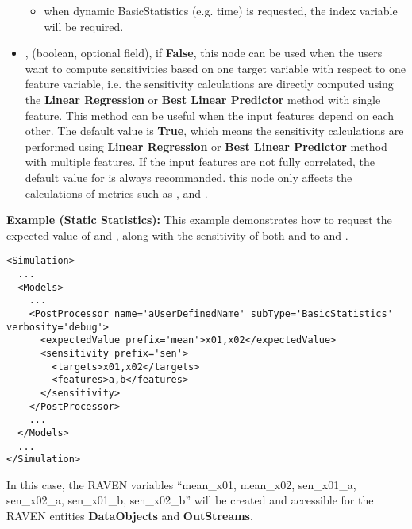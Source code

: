 \begin{itemize}
\begin{itemize}
      \item when dynamic BasicStatistics (e.g. time) is requested, the index variable   will be required.
    \end{itemize}
\item {}, \xmlDesc(boolean, optional field), if \textbf{False}, this node can be used when
    the users want to compute sensitivities based on one target variable with respect to one feature variable,
    i.e. the sensitivity calculations are directly computed using the \textbf{Linear Regression} or
    \textbf{Best Linear Predictor} method with single feature. This method can be useful when the input features
    depend on each other. The default value is \textbf{True}, which means the sensitivity calculations are performed
    using \textbf{Linear Regression} or \textbf{Best Linear Predictor} method with multiple features. If the input
    features are not fully correlated, the default value for  is always recommanded.
    \nb this node only affects the calculations of metrics such as ,
     and .
\end{itemize}
\textbf{Example (Static Statistics):}  This example demonstrates how to request the expected value of
 and , along with the sensitivity of both  and  to
 and .
\begin{lstlisting}[style=XML,morekeywords={name,subType,debug}]
<Simulation>
  ...
  <Models>
    ...
    <PostProcessor name='aUserDefinedName' subType='BasicStatistics' verbosity='debug'>
      <expectedValue prefix='mean'>x01,x02</expectedValue>
      <sensitivity prefix='sen'>
        <targets>x01,x02</targets>
        <features>a,b</features>
      </sensitivity>
    </PostProcessor>
    ...
  </Models>
  ...
</Simulation>
\end{lstlisting}

In this case, the RAVEN variables ``mean\_x01, mean\_x02, sen\_x01\_a, sen\_x02\_a, sen\_x01\_b, sen\_x02\_b''
will be created and accessible for the RAVEN entities \textbf{DataObjects} and \textbf{OutStreams}.

